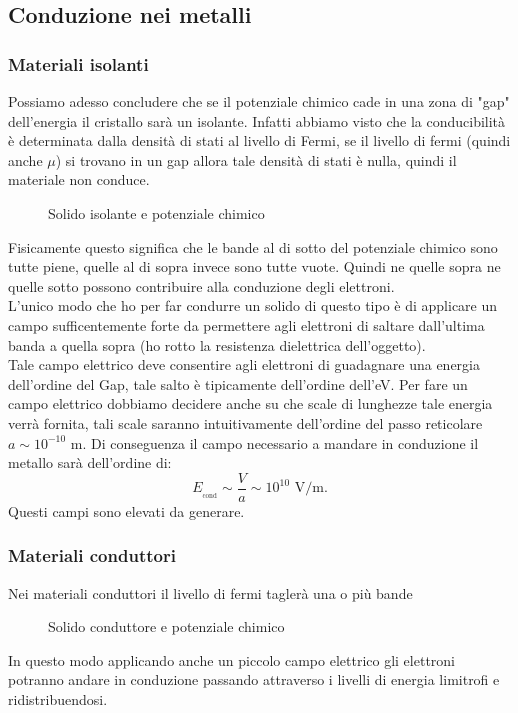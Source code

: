 \subsection{Conduzione nei metalli}
\label{subsec:Conduzione nei metalli}
\subsubsection{Materiali isolanti}
\label{subsubsec:Materiali isolanti}
Possiamo adesso concludere che se il potenziale chimico cade in una zona di "gap" dell'energia il cristallo sarà un isolante. Infatti abbiamo visto che la conducibilità è determinata dalla densità di stati al livello di Fermi, se il livello di fermi (quindi anche $\mu$) si trovano in un gap allora tale densità di stati è nulla, quindi il materiale non conduce. 
\begin{figure}[ht]
    \centering
    \caption{Solido isolante e potenziale chimico}
    \label{fig:solido-isolante-e-potenziale-chimico}
\end{figure}
Fisicamente questo significa che le bande al di sotto del potenziale chimico sono tutte piene, quelle al di sopra invece sono tutte vuote. Quindi ne quelle sopra ne quelle sotto possono contribuire alla conduzione degli elettroni. \\ 
L'unico modo che ho per far condurre un solido di questo tipo è di applicare un campo sufficentemente forte da permettere agli elettroni di saltare dall'ultima banda a quella sopra (ho rotto la resistenza dielettrica dell'oggetto). \\
Tale campo elettrico deve consentire agli elettroni di guadagnare una energia dell'ordine del Gap, tale salto è tipicamente dell'ordine dell'eV. Per fare un campo elettrico dobbiamo decidere anche su che scale di lunghezze tale energia verrà fornita, tali scale saranno intuitivamente dell'ordine del passo reticolare $a \sim 10^{-10}$ m. Di conseguenza il campo necessario a mandare in conduzione il metallo sarà dell'ordine di:
\[
	E_{_{\text{cond}}} \sim \frac{V}{a} \sim 10^{10} \text{ V/m}
.\] 
Questi campi sono elevati da generare.
\subsubsection{Materiali conduttori}
\label{subsubsec:Materiali conduttori}
Nei materiali conduttori il livello di fermi taglerà una o più bande
\begin{figure}[ht]
    \centering
    \caption{Solido conduttore e potenziale chimico}
    \label{fig:solido-conduttore-e-potenziale-chimico}
\end{figure}
In questo modo applicando anche un piccolo campo elettrico gli elettroni potranno andare in conduzione passando attraverso i livelli di energia limitrofi e ridistribuendosi.
